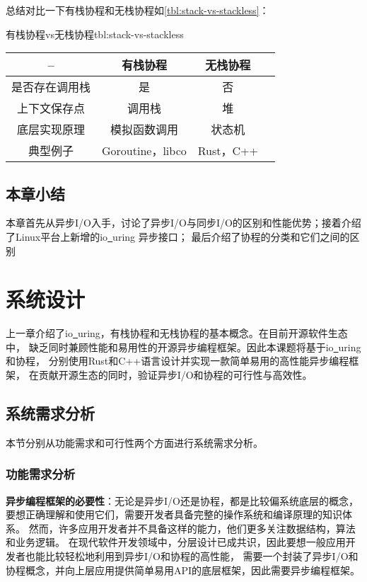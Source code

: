 \documentclass[supercite]{HustGraduPaper}
\newcommand{\rtbl}[1]{\autoref{tbl:#1}}
\theoremstyle{definition}
\begin{document}
总结对比一下有栈协程和无栈协程如\rtbl{stack-vs-stackless}：

\begin{generaltab}{有栈协程vs无栈协程}{tbl:stack-vs-stackless}
  \begin{tabular}{c|ccc}
    \toprule
    -- & 有栈协程 & 无栈协程 \\
    \midrule
    是否存在调用栈 & 是 & 否 \\
    上下文保存点 & 调用栈 & 堆 \\
    底层实现原理 & 模拟函数调用 & 状态机 \\
    典型例子 & Goroutine，libco & Rust，C++ \\
    \bottomrule
  \end{tabular}
\end{generaltab}

\subsection{本章小结}

本章首先从异步I/O入手，讨论了异步I/O与同步I/O的区别和性能优势；接着介绍了Linux平台上新增的io\underline{~}uring
异步接口；
最后介绍了协程的分类和它们之间的区别\par

\section{系统设计}
上一章介绍了io\underline{~}uring，有栈协程和无栈协程的基本概念。在目前开源软件生态中，
缺乏同时兼顾性能和易用性的开源异步编程框架。因此本课题将基于io\underline{~}uring和协程，
分别使用Rust和C++语言设计并实现一款简单易用的高性能异步编程框架，
在贡献开源生态的同时，验证异步I/O和协程的可行性与高效性。\par

\subsection{系统需求分析}

本节分别从功能需求和可行性两个方面进行系统需求分析。\par

\subsubsection{功能需求分析}

\textbf{异步编程框架的必要性}：无论是异步I/O还是协程，都是比较偏系统底层的概念，
要想正确理解和使用它们，需要开发者具备完整的操作系统和编译原理的知识体系。
然而，许多应用开发者并不具备这样的能力，他们更多关注数据结构，算法和业务逻辑。
在现代软件开发领域中，分层设计已成共识，因此要想一般应用开发者也能比较轻松地利用到异步I/O和协程的高性能，
需要一个封装了异步I/O和协程概念，并向上层应用提供简单易用API的底层框架，因此需要异步编程框架。\par
\end{document}
